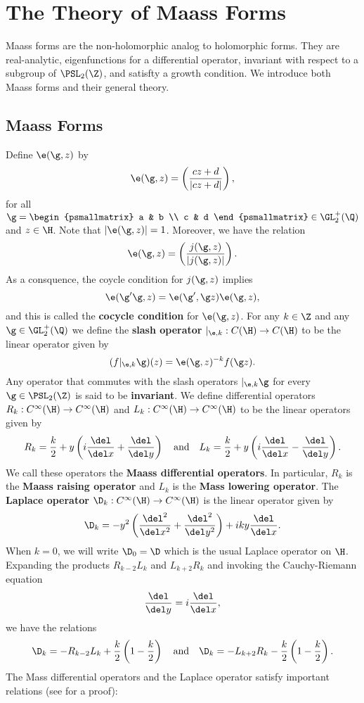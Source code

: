 \chapter{The Theory of Maass Forms}
	Maass forms are the non-holomorphic analog to holomorphic forms. They are real-analytic, eigenfunctions for a differential operator, invariant with respect to a subgroup of $\PSL_{2}(\Z)$, and satisfty a growth condition. We introduce both Maass forms and their general theory.
  \section{Maass Forms}
    Define $\e(\g,z)$ by
    \[
      \e(\g,z) = \left(\frac{cz+d}{|cz+d|}\right),
    \]
    for all $\g = \begin{psmallmatrix} a & b \\ c & d \end{psmallmatrix} \in \GL_{2}^{+}(\Q)$ and $z \in \H$. Note that $|\e(\g,z)| = 1$. Moreover, we have the relation
    \[
      \e(\g,z) = \left(\frac{j(\g,z)}{|j(\g,z)|}\right).
    \]
    As a consquence, the coycle condition for $j(\g,z)$ implies
    \[
      \e(\g'\g,z) =  \e(\g',\g z)\e(\g,z),
    \]
    and this is called the \textbf{cocycle condition} for $\e(\g,z)$. For any $k \in \Z$ and any $\g \in \GL_{2}^{+}(\Q)$ we define the \textbf{slash operator} $|_{\e,k}:C(\H) \to C(\H)$ to be the linear operator given by
    \[
      (f|_{\e,k}\g)(z) = \e(\g,z)^{-k}f(\g z).
    \]
    Any operator that commutes with the slash operators $|_{\e,k}\g$ for every $\g \in \PSL_{2}(\Z)$ is said to be \textbf{invariant}. We define differential operators $R_{k}:C^{\infty}(\H) \to C^{\infty}(\H)$ and $L_{k}:C^{\infty}(\H) \to C^{\infty}(\H)$ to be the linear operators given by
    \begin{align*}
      R_{k} = \frac{k}{2}+y\left(i\frac{\del}{\del x}+\frac{\del}{\del y}\right) \quad \text{and} \quad L_{k} = \frac{k}{2}+y\left(i\frac{\del}{\del x}-\frac{\del}{\del y}\right).
    \end{align*}
    We call these operators the \textbf{Maass differential operators}. In particular, $R_{k}$ is the \textbf{Maass raising operator} and $L_{k}$ is the \textbf{Mass lowering operator}. The \textbf{Laplace operator} $\D_{k}:C^{\infty}(\H) \to C^{\infty}(\H)$ is the linear operator given by
    \[
      \D_{k} = -y^{2}\left(\frac{\del^{2}}{\del x^{2}}+\frac{\del^{2}}{\del y^{2}}\right)+iky\frac{\del}{\del x}.
    \]
    When $k = 0$, we will write $\D_{0} = \D$ which is the usual Laplace operator on $\H$. Expanding the products $R_{k-2}L_{k}$ and $L_{k+2}R_{k}$ and invoking the Cauchy-Riemann equation
    \[
      \frac{\del}{\del y} = i\frac{\del}{\del x},
    \]
    we have the relations
    \[
      \D_{k} = -R_{k-2}L_{k}+\frac{k}{2}\left(1-\frac{k}{2}\right) \quad \text{and} \quad \D_{k} = -L_{k+2}R_{k}-\frac{k}{2}\left(1-\frac{k}{2}\right).
    \]
     The Mass differential operators and the Laplace operator satisfy important relations (see \cite{bumpautomorphic1997} for a proof):

